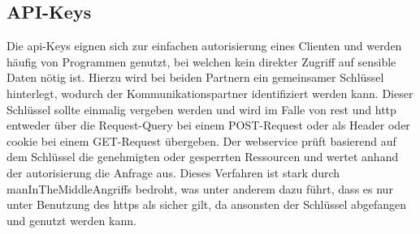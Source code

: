 \subsection{API-Keys}\label{subsec:api-keys}
	Die \gls{api}-Keys eignen sich zur einfachen \gls{autorisierung} eines Clienten
	und werden häufig von Programmen genutzt,
	bei welchen kein direkter Zugriff auf sensible Daten nötig ist.
	Hierzu wird bei beiden Partnern ein gemeinsamer Schlüssel hinterlegt,
	wodurch der Kommunikationspartner identifiziert werden kann.
	Dieser Schlüssel sollte einmalig vergeben werden und wird im Falle von \gls{rest}
	und \gls{http} entweder über die Request-Query bei einem POST-Request
	oder als Header oder \gls{cookie} bei einem GET-Request übergeben.
	Der \gls{webservice} prüft basierend auf dem Schlüssel die genehmigten oder gesperrten Ressourcen
	und wertet anhand der \gls{autorisierung} die Anfrage aus.
	Dieses Verfahren ist stark durch \glspl{manInTheMiddleAngriff} bedroht,
	was unter anderem dazu führt,
	dass es nur unter Benutzung des \gls{https} als sicher gilt,
	da ansonsten der Schlüssel abgefangen und genutzt werden kann.